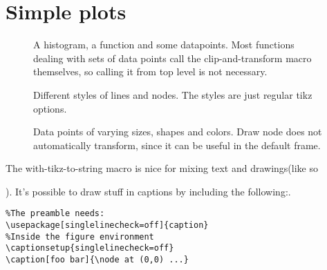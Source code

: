 \documentclass{article}
\begin{document}
\section{Simple plots}
\begin{figure}[H]
\centering

\captionsetup{singlelinecheck=off}
\caption[asdf]{A histogram, a function and some datapoints. Most functions 
dealing with sets of data points call the clip-and-transform macro themselves, so calling it from 
top level is not necessary.}
\end{figure}
\begin{figure}[H]
\centering

\captionsetup{singlelinecheck=off}
\caption[asdf]{Different styles of lines and nodes. The styles are just regular tikz options.}
\end{figure}
\begin{figure}[H]
\centering

\captionsetup{singlelinecheck=off}
\caption[asdf]{Data points of varying sizes, shapes and colors. Draw node does not automatically transform, 
since it can be useful in the default frame.}
\end{figure}


The with-tikz-to-string macro is nice for mixing text and drawings(like so 
). It's possible to draw stuff in captions
by including the following:.
\begin{verbatim}
%The preamble needs:
\usepackage[singlelinecheck=off]{caption}
%Inside the figure environment
\captionsetup{singlelinecheck=off}
\caption[foo bar]{\node at (0,0) ...}
\end{verbatim}
\end{document}
